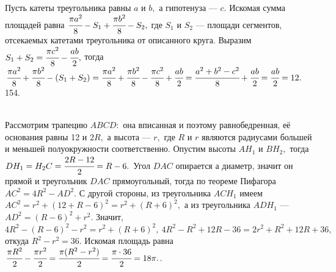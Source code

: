 \documentclass[12pt]{article}
\begin{document}
Пусть катеты треугольника равны $a$ и $b,$ а гипотенуза --- $c.$ Искомая сумма площадей равна $\cfrac{\pi a^2}{8}-S_1+\cfrac{\pi b^2}{8}-S_2,$ где $S_1$ и $S_2$ --- площади сегментов, отсекаемых катетами треугольника от описанного круга. Выразим $S_1+S_2=\cfrac{\pi c^2}{8}-\cfrac{ab}{2},$ тогда
$\cfrac{\pi a^2}{8}+\cfrac{\pi b^2}{8}-(S_1+S_2)=\cfrac{\pi a^2}{8}+\cfrac{\pi b^2}{8}-\cfrac{\pi c^2}{8}+\cfrac{ab}{2}=\cfrac{a^2+b^2-c^2}{8}+\cfrac{ab}{2}=
\cfrac{ab}{2}=12.$\\
154. \begin{figure}[ht!]
\end{figure}\\
Рассмотрим трапецию $ABCD:$ она вписанная и поэтому равнобедренная, её основания равны 12 и $2R,$ а высота --- $r,$ где $R$ и $r$ являются радиусами большей и меньшей полуокружности соответственно. Опустим высоты $AH_1$ и $BH_2,$ тогда $DH_1=H_2C=\cfrac{2R-12}{2}=R-6.$ Угол $DAC$ опирается а диаметр, значит он прямой и треугольник $DAC$ прямоугольный, тогда по теореме Пифагора $AC^2=4R^2-AD^2.$ С другой стороны, из треугольника $ACH_1$ имеем $AC^2=r^2+(12+R-6)^2=r^2+(R+6)^2,$ а из треугольника $ADH_1$ --- $AD^2=(R-6)^2+r^2.$ Значит, $4R^2-(R-6)^2-r^2=r^2+(R+6)^2,\ 4R^2-R^2+12R-36=2r^2+R^2+12R+36,$ откуда $R^2-r^2=36.$ Искомая площадь равна $\cfrac{\pi R^2}{2}-\cfrac{\pi r^2}{2}=\cfrac{\pi(R^2-r^2)}{2}=\cfrac{\pi\cdot36}{2}=18\pi.$\newpage{}. \begin{figure}[ht!]
\end{figure}\\
\end{document}
